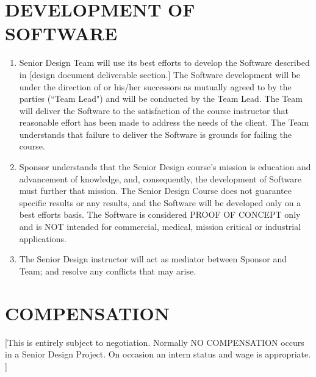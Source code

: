 \documentclass[11pt]{article}
\begin{document}
\section{DEVELOPMENT OF SOFTWARE }
\begin{enumerate}  \itemsep4pt \parskip0pt 
\item  Senior Design Team will use its best efforts to develop the Software described in [design document deliverable section.] The Software development will be under the direction of  or his/her successors as mutually agreed to by the parties (``Team Lead") and will be conducted by the Team Lead.  The Team will deliver the Software to the satisfaction of the course instructor that reasonable effort has been made to address the needs of the client.  The Team understands that failure to deliver the Software is grounds for failing the course. 

\item  Sponsor understands that the Senior Design course's mission is education and advancement of knowledge, and, consequently, the development of Software must further that mission. The Senior Design Course does not guarantee specific results or any results, and the Software will be developed only on a best efforts basis.  The Software is considered PROOF OF CONCEPT only and is NOT intended for commercial, medical, mission critical or industrial applications.

\item  The Senior Design instructor will act as mediator between Sponsor and Team; and resolve any conflicts that may arise.
\end{enumerate}

\section{COMPENSATION}

[This is entirely subject to negotiation. Normally NO COMPENSATION occurs in a Senior Design Project.  On occasion an intern status and wage is appropriate. ] 
\end{document}
